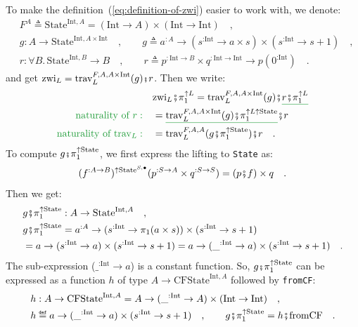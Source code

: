 To make the definition~(\ref{eq:definition-of-zwi}) easier to work
with, we denote:
\begin{align*}
 & F^{A}\triangleq\text{State}^{\text{Int},A}=(\text{Int}\rightarrow A)\times(\text{Int}\rightarrow\text{Int})\quad,\\
 & g:A\rightarrow\text{State}^{\text{Int},A\times\text{Int}}\quad,\quad\quad g\triangleq a^{:A}\rightarrow(s^{:\text{Int}}\rightarrow a\times s)\times(s^{:\text{Int}}\rightarrow s+1)\quad,\\
 & r:\forall B.\,\text{State}^{\text{Int},B}\rightarrow B\quad,\quad\quad r\triangleq p^{:\text{Int}\rightarrow B}\times q^{:\text{Int}\rightarrow\text{Int}}\rightarrow p(0^{:\text{Int}})\quad.
\end{align*}
and get $\text{zwi}_{L}=\text{trav}_{L}^{F,A,A\times\text{Int}}(g)\bef r$.
Then we write:
\begin{align*}
 & \text{zwi}_{L}\bef\pi_{1}^{\uparrow L}=\text{trav}_{L}^{F,A,A\times\text{Int}}(g)\bef\gunderline{r\bef\pi_{1}^{\uparrow L}}\\
{\color{greenunder}\text{naturality of }r:}\quad & =\gunderline{\text{trav}_{L}^{F,A,A\times\text{Int}}(g)\bef\pi_{1}^{\uparrow L\uparrow\text{State}}}\bef r\\
{\color{greenunder}\text{naturality of }\text{trav}_{L}:}\quad & =\text{trav}_{L}^{F,A,A}(g\bef\pi_{1}^{\uparrow\text{State}})\bef r\quad.
\end{align*}
To compute $g\bef\pi_{1}^{\uparrow\text{State}}$, we first express
the lifting to \lstinline!State! as:
\[
(f^{:A\rightarrow B})^{\uparrow\text{State}^{S,\bullet}}(p^{:S\rightarrow A}\times q^{:S\rightarrow S})=(p\bef f)\times q\quad.
\]
Then we get:
\begin{align*}
 & g\bef\pi_{1}^{\uparrow\text{State}}:A\rightarrow\text{State}^{\text{Int},A}\quad,\\
 & g\bef\pi_{1}^{\uparrow\text{State}}=a^{:A}\rightarrow(s^{:\text{Int}}\rightarrow\pi_{1}(a\times s))\times(s^{:\text{Int}}\rightarrow s+1)\\
 & =a\rightarrow(s^{:\text{Int}}\rightarrow a)\times(s^{:\text{Int}}\rightarrow s+1)=a\rightarrow(\_^{:\text{Int}}\rightarrow a)\times(s^{:\text{Int}}\rightarrow s+1)\quad.
\end{align*}
The sub-expression ($\_^{:\text{Int}}\rightarrow a$) is a constant
function. So, $g\bef\pi_{1}^{\uparrow\text{State}}$ can be expressed
as a function $h$ of type $A\rightarrow\text{CFState}^{\text{Int},A}$
followed by \lstinline!fromCF!:
\begin{align*}
 & h:A\rightarrow\text{CFState}^{\text{Int},A}=A\rightarrow(\_^{:\text{Int}}\rightarrow A)\times(\text{Int}\rightarrow\text{Int})\quad,\\
 & h\triangleq a\rightarrow(\_^{:\text{Int}}\rightarrow a)\times(s^{:\text{Int}}\rightarrow s+1)\quad,\quad\quad g\bef\pi_{1}^{\uparrow\text{State}}=h\bef\text{fromCF}\quad.
\end{align*}

